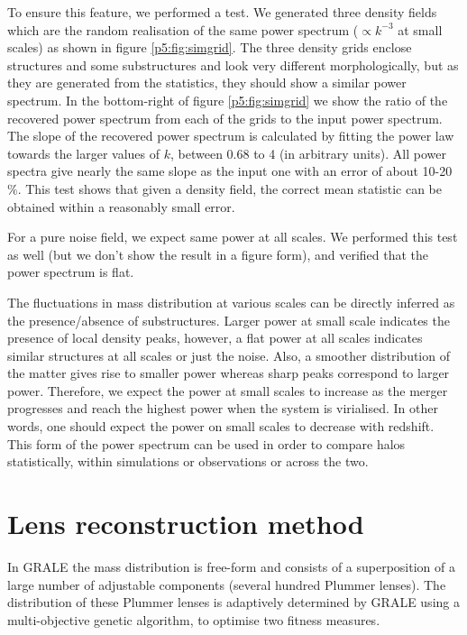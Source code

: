 \documentclass[
  11pt,
  twoside,
  openright,
  titlepage,
  headings=optiontoheadandtoc
]{scrbook}
\begin{document}
To ensure this feature, we performed a test.  We generated three density fields which are the
random realisation of the same power spectrum ($\propto k^{-3}$ at small scales) as shown in figure
\ref{p5:fig:simgrid}. The three density grids enclose structures and some substructures and look very
different morphologically, but as they are generated from the statistics, they should show
a similar power spectrum. In the bottom-right of figure \ref{p5:fig:simgrid} we show the ratio of the
recovered power spectrum from each of the grids to the input power spectrum. The slope
of the recovered power spectrum is calculated by fitting the power law towards the larger
values of $k$, between 0.68 to 4 (in arbitrary units).
All power spectra give nearly the same slope as the input one with an error of about 10-20$\%$.
This test shows that given a density field, the correct mean statistic can be obtained within
a reasonably small error.

For a pure noise field, we expect same power at all scales. We performed this test as well (but we
don't show the result in a figure form), and verified that the power spectrum is flat.

The fluctuations in mass distribution at various scales can be directly inferred as the
presence/absence of substructures. Larger power at small scale indicates the presence of local
density peaks, however, a flat power at all scales indicates similar structures at all scales
or just the noise.  Also, a smoother distribution of the matter gives rise to smaller power whereas
sharp peaks correspond to larger power. Therefore, we expect the power at small scales to
increase as the merger progresses and reach the highest power when the system is virialised.
In other words, one should expect the power on small scales to decrease with redshift.
This form of the power spectrum can be used in order to compare halos statistically, within
simulations or observations or across the two.


\section{Lens reconstruction method}\label{p5:sec:grale}

In GRALE \citep{2007MNRAS.380.1729L,2008MNRAS.389..415L} the mass
distribution is free-form and consists of a superposition of a large
number of adjustable components (several hundred Plummer lenses).  The
distribution of these Plummer lenses is adaptively determined by GRALE
using a multi-objective genetic algorithm, to optimise two fitness
measures.
\end{document}
